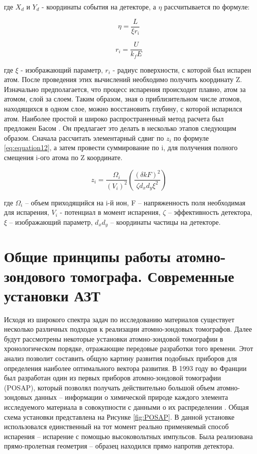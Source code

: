 где $X_d$ и $Y_d$ - координаты события на детекторе, а $\eta$ рассчитывается по формуле:

\begin{equation}
	\label{eq:equation10}
	\eta = \frac{L}{\xi r_i}
\end{equation}

\begin{equation}
	\label{eq:equation11}
	r_i = \frac{U}{k_f E}
\end{equation}

где $\xi$ - изображающий параметр, $r_i$ - радиус поверхности, с которой был испарен атом. После проведения этих вычислений необходимо получить координату Z. Изначально предполагается, что процесс испарения происходит плавно, атом за атомом, слой за слоем. Таким образом, зная о приблизительном числе атомов, находящихся в одном слое, можно восстановить глубину, с которой испарился атом. Наиболее простой и широко распространенный метод расчета был предложен Басом \cite{Bas95}. Он предлагает это делать в несколько этапов следующим образом. Сначала рассчитать элементарный сдвиг по $z_i$ по формуле \cref{eq:equation12}, а затем провести суммирование по i, для получения полного смещения i-ого атома по Z координате.

\begin{equation}
	\label{eq:equation12}
	z_i = \frac{\Omega_i}{(V_i)^2} \left(\frac{(\delta k F)^2}{\zeta d_x d_y \xi^2}\right)
\end{equation}

где  $\Omega_i$ – объем приходящийся на i-й ион, F – напряженность поля необходимая для испарения, $V_i$  - потенциал в момент испарения, $\zeta$ – эффективность детектора, $\xi$ – изображающий параметр, $d_x d_y$ – координаты частицы на детекторе.

\FloatBarrier

\section{Общие принципы работы атомно-зондового томографа. Современные установки АЗТ}\label{sec:ch1/sec4}

Исходя из широкого спектра задач по исследованию материалов существует несколько различных подходов к реализации атомно-зондовых томографов. Далее будут рассмотрены некоторые установки атомно-зондовой томографии в хронологическом порядке, отражающие передовые разработки того времени. Этот анализ позволит составить общую картину развития подобных приборов для определения наиболее оптимального вектора развития. В 1993 году во Франции был разработан один из первых приборов атомно-зондовой томографии (POSAP), который позволял получать действительно большой объем атомно-зондовых данных – информации о химической природе каждого элемента исследуемого материала в совокупности с данными о их распределении  \cite{Deconihout93}. Общая схема установки представлена на Рисунке \cref{fig:POSAP}. В данной установке использовался единственный на тот момент реально применяемый способ испарения – испарение с помощью высоковольтных импульсов. Была реализована прямо-пролетная геометрия – образец находился прямо напротив детектора.

